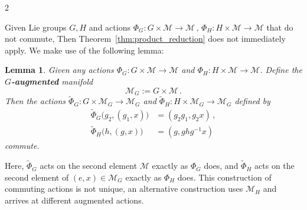 \documentclass{article}
\newtheorem{lemma}[theorem]{Lemma}
\newcommand{\M}{\mathcal{M}}                                %
\newcommand{\state}{x}
\begin{document}
\begin{multicols}{2}

Given Lie groups $G,H$ and actions $\Phi_G:G\times\M\rightarrow\M\,,\, \Phi_H:H\times\M\rightarrow\M$ that do not commute, 
Then Theorem~\ref{thm:product_reduction} does not immediately apply. We make use of the following lemma:

\begin{lemma}\label{lemma:commuting_actions_by_augmentation}
    Given any actions $\Phi_G:G\times\M\rightarrow\M$ and $\Phi_H: H\times \M \rightarrow\M$.
    Define the \textbf{$G$-augmented} manifold 
    \begin{equation}
        \M_G := G \times \M\,.
    \end{equation} 
    Then the actions $\widetilde{\Phi}_G:G\times\M_G\rightarrow\M_G$ and $\widetilde{\Phi}_H:H\times\M_G\rightarrow\M_G$ defined by
    \begin{align}
        \widetilde{\Phi}_G \big(g_2,(g_1,\state)\big) &= (g_2 g_1, g_2 \state)\,, \\
        \widetilde{\Phi}_H \big(h, (g,\state)\big) &= (g, ghg^{-1}\state)
    \end{align}
    commute.
\end{lemma}
Here, $\widetilde{\Phi}_G$ acts on the second element $\M$ exactly as $\Phi_G$ does, and $\widetilde{\Phi}_H$ acts on the second element of $(e,x) \in \M_G$ exactly as $\Phi_H$ does. This construction of commuting actions is not unique, an alternative construction uses $\M_H$ and arrives at different augmented actions. 


\end{multicols}
\end{document}

